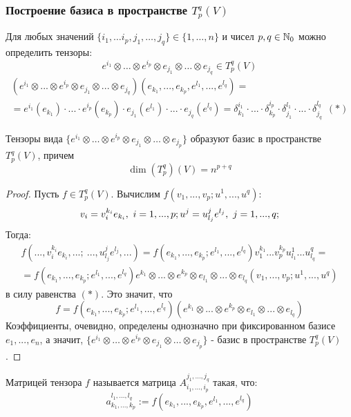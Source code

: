 \subsubsection*{Построение базиса в пространстве $T_p^q(V)$}
Для любых значений $\{i_1,\dots i_p,j_1,\dots,j_q\}\in \{1,\dots,n\}$ и чисел $p,q \in \mathbb{N}_0$ можно определить тензоры:
\[e^{i_1}\otimes \dots \otimes e^{i_p}\otimes e_{j_1}\otimes \dots\otimes e_{j_q}\in T_p^q(V)\]
\begin{multline*}
    (e^{i_1}\otimes ... \otimes e^{i_p}\otimes e_{j_1}\otimes ... \otimes e_{j_q})(e_{k_1}, ... ,e_{k_p},e^{l_1},...,e^{l_q})=\\
    =e^{i_1}(e_{k_1})\cdot ... \cdot e^{i_p}(e_{k_p})\cdot e_{j_1}(e^{l_1})\cdot ... \cdot e_{j_q}(e^{l_q}) = \delta_{k_1}^{i_1}\cdot ... \cdot \delta_{k_p}^{i_p} \cdot \delta_{j_1}^{l_1}\cdot ... \cdot \delta_{j_q}^{l_q} \ \ (*)
\end{multline*} 
\begin{theorem}
    Тензоры вида $\{e^{i_1}\otimes \dots \otimes e^{i_p}\otimes e_{j_1}\otimes \dots\otimes e_{j_p}\}$ образуют базис в пространстве $T_p^q(V)$, причем
    \[\dim{(T_p^q)}(V)=n^{p+q}\]
\end{theorem}
\begin{proof}
    Пусть $f \in T_p^q(V)$. Вычислим $f(v_1,...,v_p; u^1,...,u^q)$:
    \[v_i = v_i^{k_i}e_{k_i}, \ i = 1,...,p; \\ u^j = u_{l_j}^j e^{l_j}, \ j = 1,...,q;\]
    Тогда:
    \begin{multline*}
        f(...,v_i^{k_i}e_{k_i},...; \ ...,u_{l_j}^j e^{l_j},...) = f(e_{k_1},...,e_{k_p}; e^{l_1},...,e^{l_q})v_1^{k_1}...v_p^{k_p}u_{l_1}^1...u_{l_q}^q =\\= f(e_{k_1},...,e_{k_p}; e^{l_1},...,e^{l_q}) e^{k_1}\otimes...\otimes e^{k_p}\otimes e_{l_1}\otimes...\otimes  e_{l_q} (v_1,...,v_p; u^1,...,u^q) 
    \end{multline*}
    в силу равенства $(*)$. Это значит, что
    \[f = f(e_{k_1},...,e_{k_p}; e^{l_1},...,e^{l_q})(e^{k_1}\otimes...\otimes e^{k_p}\otimes e_{l_1}\otimes...\otimes e_{l_q})\]
    Коэффициенты, очевидно, определены однозначно при фиксированном базисе $e_1,...,e_n$, а значит, $\{e^{i_1}\otimes \dots \otimes e^{i_p}\otimes e_{j_1}\otimes \dots\otimes e_{j_p}\}$ - базис в пространстве $T_p^q(V)$.  
\end{proof}
\begin{definition}
    Матрицей тензора $f$ называется матрица $A_{i_1,...,i_p}^{j_1,...,j_q}$ такая, что:
    $$a_{k_1,...,k_p}^{l_1,...,l_q} := f(e_{k_1},...,e_{k_p}, e^{l_1},...,e^{l_q})$$
\end{definition}
